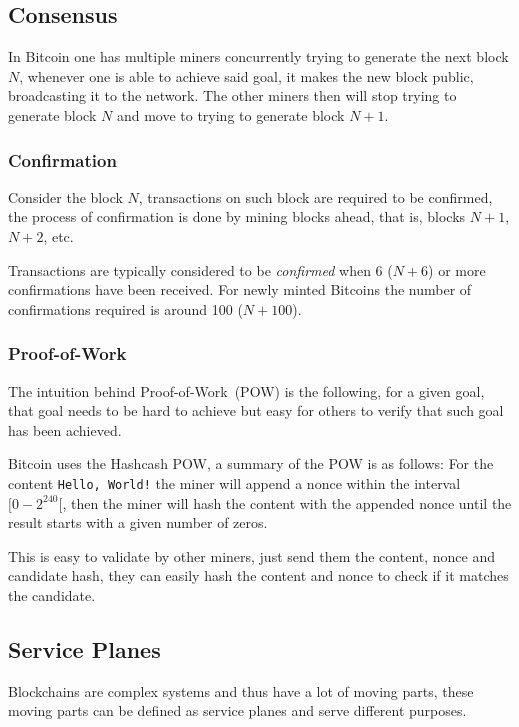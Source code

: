 \subsection{Consensus}
In Bitcoin one has multiple miners concurrently trying to generate the next block $N$,
whenever one is able to achieve said goal,
it makes the new block public,
broadcasting it to the network.
The other miners then will stop trying to generate block $N$ and move to trying to generate block $N+1$.

\subsubsection{Confirmation}
Consider the block $N$, transactions on such block are required to be confirmed,
the process of confirmation is done by mining blocks ahead, that is, blocks $N+1$, $N+2$, etc.

Transactions are typically considered to be \textit{confirmed} when 6 ($N+6$) or more confirmations have been received.
For newly minted Bitcoins the number of confirmations required is around 100 ($N+100$).

\subsubsection{Proof-of-Work}
The intuition behind Proof-of-Work~(POW) is the following,
for a given goal, that goal needs to be hard to achieve but easy for others to verify that such goal has been achieved.

Bitcoin uses the Hashcash POW, a summary of the POW is as follows:
For the content \texttt{Hello, World!} the miner will append a nonce within the interval $[0-2^{240}[$,
then the miner will hash the content with the appended nonce until the result starts with a given number of zeros.

This is easy to validate by other miners, just send them the content, nonce and candidate hash,
they can easily hash the content and nonce to check if it matches the candidate.

\subsection{Service Planes}
Blockchains are complex systems and thus have a lot of moving parts,
these moving parts can be defined as service planes and serve different purposes.

